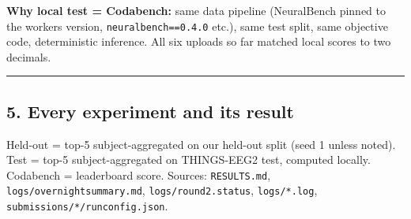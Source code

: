 \documentclass[
  11pt,
]{article}
\renewcommand{\_}{\oldunderscore\allowbreak}
\begin{document}
\textbf{Why local test = Codabench:}
same data pipeline (NeuralBench pinned
to the worker\textquotesingle s version,
\texttt{neuralbench==0.4.0} etc.), same
test split, same objective code,
deterministic inference. All six uploads
so far matched local scores to two
decimals.

\begin{center}\rule{0.5\linewidth}{0.5pt}\end{center}

\subsection{5. Every experiment and its
result}\label{every-experiment-and-its-result}

Held-out = top-5 subject-aggregated on
our held-out split (seed 1 unless
noted). Test = top-5 subject-aggregated
on THINGS-EEG2 test, computed locally.
Codabench = leaderboard score. Sources:
\texttt{RESULTS.md},
\texttt{logs/overnight\_summary.md},
\texttt{logs/round2.status},
\texttt{logs/*.log},
\texttt{submissions/*/run\_config.json}.
\end{document}
